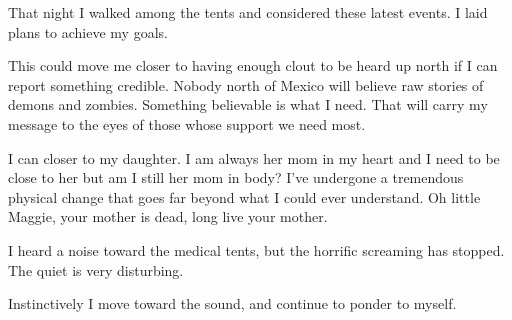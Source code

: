 That night I walked among the tents and considered these latest events. I laid plans to achieve my goals.

This could move me closer to having enough clout to be heard up north if I can report something credible. Nobody north of Mexico will believe raw stories of demons and zombies. Something believable is what I need. That will carry my message to the eyes of those whose support we need most.

I can closer to my daughter. I am always her mom in my heart and I need to be close to her but am I still her mom in body? I've undergone a tremendous physical change that goes far beyond what I could ever understand. Oh little Maggie, your mother is dead, long live your mother.

I heard a noise toward the medical tents, but the horrific screaming has stopped. The quiet is very disturbing.

Instinctively I move toward the sound, and continue to ponder to myself.










